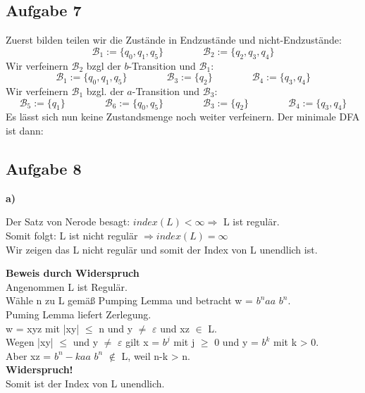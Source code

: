 \documentclass[a4paper,graphics,11pt]{article}
\newcommand{\aufgabe}[1]{\subsection*{Aufgabe #1}}
\begin{document}
\aufgabe{7}
Zuerst bilden teilen wir die Zustände in Endzustände und nicht-Endzustände:
$$
    \mathcal{B}_1 := \{q_0, q_1, q_5\}
    \qquad\qquad
    \mathcal{B}_2 := \{q_2, q_3, q_4\}
$$
Wir verfeinern $\mathcal{B}_2$ bzgl der $b$-Transition und $\mathcal{B}_1$:
$$
    \mathcal{B}_1 := \{q_0, q_1, q_5\}
    \qquad\qquad
    \mathcal{B}_3 := \{q_2\}
    \qquad\qquad
    \mathcal{B}_4 := \{q_3, q_4\}
$$
Wir verfeinern $\mathcal{B}_1$ bzgl. der $a$-Transition und $\mathcal{B}_3$:
$$
    \mathcal{B}_5 := \{q_1\}
    \qquad\qquad
    \mathcal{B}_6 := \{q_0, q_5\}
    \qquad\qquad
    \mathcal{B}_3 := \{q_2\}
    \qquad\qquad
    \mathcal{B}_4 := \{q_3, q_4\}
$$
Es lässt sich nun keine Zustandsmenge noch weiter verfeinern.
Der minimale DFA ist dann:
\begin{center}
\end{center}

\newpage
\aufgabe{8}

\textbf{a)}

Der Satz von Nerode besagt: $index(L) < \infty \Rightarrow$ L ist regulär.\\
Somit folgt: L ist nicht regulär $\Rightarrow index(L) = \infty$\\
Wir zeigen das L nicht regulär und somit der Index von L unendlich ist.

\textbf{Beweis durch Widerspruch}\\
Angenommen L ist Regulär.\\
Wähle n zu L gemäß Pumping Lemma und betracht w = $b^n aa $ $b^n$.\\
Puming Lemma liefert Zerlegung.\\
w = xyz mit |xy| $\leq$ n und y $\neq$ $\varepsilon$ und xz $\in$ L.\\
Wegen |xy| $\leq$ und y $\neq$ $\varepsilon$ gilt x = $b^j$ mit j $\geq$ 0 und y = $b^k$ mit k > 0.\\
Aber xz = $b^n-kaa$ $b^n$ $\not\in$ L, weil n-k > n.\\
\textbf{Widerspruch!}\\
Somit ist der Index von L unendlich.\\
\end{document}
